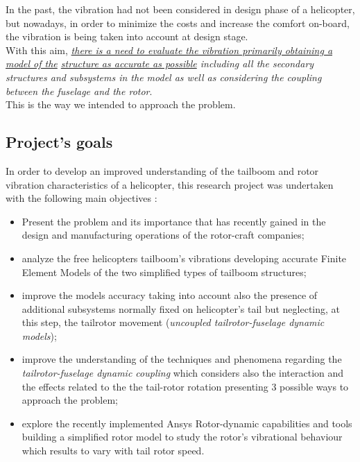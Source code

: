 \noindent
In the past, the vibration had not been considered in design phase of a helicopter, but nowadays, in order to minimize the costs and increase the comfort on-board, the vibration is being taken into account at design
stage. \\ With this aim, \emph{\underline{there is a need to evaluate the vibration primarily obtaining a model of the} \underline{structure as accurate as possible} including all the secondary structures and subsystems in the model as well as considering the coupling between the fuselage and the rotor}. \\ This is the way we intended to approach the problem. \\


\clearpage
\subsection*{Project's goals}

\noindent
In order to develop an improved understanding of the tailboom and rotor vibration characteristics of a helicopter, this research project was undertaken with the following main objectives : 
\begin{itemize}
	
	\item Present the problem and its importance that has recently gained in the design and manufacturing operations of the rotor-craft companies; 
	
	\item analyze the free helicopters tailboom's vibrations developing accurate Finite Element Models of the two simplified types of tailboom structures;
	
	\item improve the models accuracy taking into account also the presence of additional subsystems
	normally fixed on helicopter's tail but neglecting, at this step, the tailrotor movement (\emph{uncoupled tailrotor-fuselage dynamic models});
	
	\item improve the understanding of the techniques and phenomena regarding the \emph{tailrotor-fuselage dynamic coupling} which considers also the interaction and the effects related to the the tail-rotor rotation presenting 3 possible ways to approach the problem;
	
	\item explore the recently implemented Ansys Rotor-dynamic capabilities and	tools building a simplified rotor model to study the rotor's vibrational behaviour which results to vary with tail rotor speed.
\end{itemize}

\bigskip